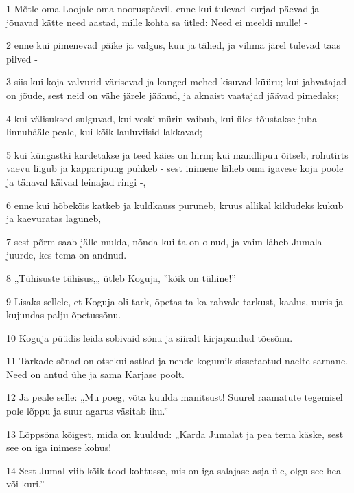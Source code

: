 \par 1 Mõtle oma Loojale oma nooruspäevil, enne kui tulevad kurjad päevad ja jõuavad kätte need aastad, mille kohta sa ütled: Need ei meeldi mulle! -
\par 2 enne kui pimenevad päike ja valgus, kuu ja tähed, ja vihma järel tulevad taas pilved -
\par 3 siis kui koja valvurid värisevad ja kanged mehed kisuvad küüru; kui jahvatajad on jõude, sest neid on vähe järele jäänud, ja aknaist vaatajad jäävad pimedaks;
\par 4 kui välisuksed sulguvad, kui veski mürin vaibub, kui üles tõustakse juba linnuhääle peale, kui kõik lauluviisid lakkavad;
\par 5 kui küngastki kardetakse ja teed käies on hirm; kui mandlipuu õitseb, rohutirts vaevu liigub ja kapparipung puhkeb - sest inimene läheb oma igavese koja poole ja tänaval käivad leinajad ringi -,
\par 6 enne kui hõbeköis katkeb ja kuldkauss puruneb, kruus allikal kildudeks kukub ja kaevuratas laguneb,
\par 7 sest põrm saab jälle mulda, nõnda kui ta on olnud, ja vaim läheb Jumala juurde, kes tema on andnud.
\par 8 „Tühisuste tühisus,„ ütleb Koguja, ”kõik on tühine!”
\par 9 Lisaks sellele, et Koguja oli tark, õpetas ta ka rahvale tarkust, kaalus, uuris ja kujundas palju õpetussõnu.
\par 10 Koguja püüdis leida sobivaid sõnu ja siiralt kirjapandud tõesõnu.
\par 11 Tarkade sõnad on otsekui astlad ja nende kogumik sissetaotud naelte sarnane. Need on antud ühe ja sama Karjase poolt.
\par 12 Ja peale selle: „Mu poeg, võta kuulda manitsust! Suurel raamatute tegemisel pole lõppu ja suur agarus väsitab ihu.”
\par 13 Lõppsõna kõigest, mida on kuuldud: „Karda Jumalat ja pea tema käske, sest see on iga inimese kohus!
\par 14 Sest Jumal viib kõik teod kohtusse, mis on iga salajase asja üle, olgu see hea või kuri.”



